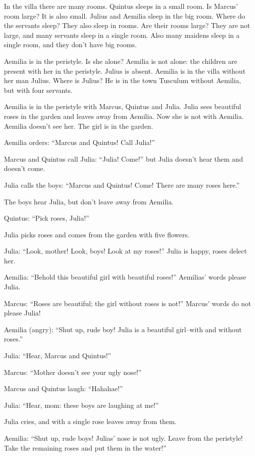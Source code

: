 In the villa there are many rooms. Quintus sleeps in a small room. Is Marcus' room large? It is also small. Julius and Aemilia sleep in the big room. Where do the servants sleep? They also sleep in rooms. Are their rooms large? They are not large, and many servants sleep in a single room. Also many maidens sleep in a single room, and they don't have big rooms.

Aemilia is in the peristyle. Is she alone? Aemilia is not alone: the children are present with her in the peristyle. Julius is absent. Aemilia is in the villa without her man Julius. Where is Julius? He is in the town Tusculum without Aemilia, but with four servants.

Aemilia is in the peristyle with Marcus, Quintus and Julia. Julia sees beautiful roses in the garden and leaves away from Aemilia. Now she is not with Aemilia. Aemilia doesn't see her. The girl is in the garden.

Aemilia orders: ``Marcus and Quintus! Call Julia!''

Marcus and Quintus call Julia: ``Julia! Come!'' but Julia doesn't hear them and doesn't come.

Julia calls the boys: ``Marcus and Quintus! Come! There are many roses here.''

The boys hear Julia, but don't leave away from Aemilia.

Quintus: ``Pick roses, Julia!''

Julia picks roses and comes from the garden with five flowers.

Julia: ``Look, mother! Look, boys! Look at my roses!'' Julia is happy, roses delect her.

Aemilia: ``Behold this beautiful girl with beautiful roses!'' Aemilias' words please Julia.

Marcus: ``Roses are beautiful; the girl without roses is not!'' Marcus' words do not please Julia!

Aemilia (angry): ``Shut up, rude boy! Julia is a beautiful girl--with and without roses.''

Julia: ``Hear, Marcus and Quintus!''

Marcus: ``Mother doesn't see your ugly nose!''

Marcus and Quintus laugh: ``Hahahae!''

Julia: ``Hear, mom: these boys are laughing at me!''

Julia cries, and with a single rose leaves away from them.

Aemilia: ``Shut up, rude boys! Julias' nose is not ugly. Leave from the peristyle! Take the remaining roses and put them in the water!''

